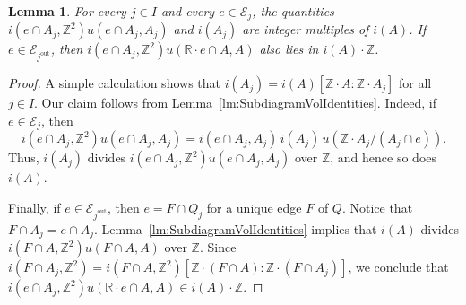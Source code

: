 \documentclass[11pt]{amsart}
\numberwithin{equation}{section}
\theoremstyle{plain}
\newtheorem{lemma}[theorem]{Lemma}
\theoremstyle{definition}
\theoremstyle{remark}
\begin{document}
\begin{lemma}\label{lm:exponents}
  For every $j\in I$ and every $e\in \mathcal{E}_j$, the quantities
  $i(e\cap A_j,{\mathbb{Z}}^2)u(e\cap A_j,A_j)$ and $i(A_j)$ are integer
  multiples of $i(A)$. If $e\in \mathcal{E}_j^\operatorname{out}$, then
  $i(e\cap A_j,{\mathbb{Z}}^2)u({\mathbb{R}}{\!\cdot\!} e\cap A,A)$ also lies in
  $i(A){\!\cdot\!} {\mathbb{Z}}$.
\end{lemma} 
\begin{proof}
  A simple calculation shows that $i(A_j)=i(A) [{\mathbb{Z}}{\!\cdot\!}
  A:{\mathbb{Z}}{\!\cdot\!} A_j]$ for all $j\in I$.  Our claim follows from
  Lemma~\ref{lm:SubdiagramVolIdentities}. Indeed, if $e\in
  \mathcal{E}_j$, then
\[
i(e\cap A_j,{\mathbb{Z}}^2)u(e\cap A_j,A_j)=i(e\cap A_j,A_j) \,i(A_j)\, u({\mathbb{Z}}{\!\cdot\!} A_j/(A_j\cap e)).
\]
 Thus, $i(A_j)$ divides  $i(e\cap A_j,{\mathbb{Z}}^2)u(e\cap A_j,A_j)$ over ${\mathbb{Z}}$, and
 hence so
 does $i(A)$. 

 Finally, if $e\in \mathcal{E}_j^\operatorname{out}$, then $e=F\cap Q_j$ for
 a unique edge $F$ of $Q$. Notice that $F\cap A_j=e\cap
 A_j$. Lemma~\ref{lm:SubdiagramVolIdentities} implies that $i(A)$
 divides $i(F\cap A,{\mathbb{Z}}^2)u(F\cap A,A)$ over ${\mathbb{Z}}$. Since $i(F\cap
 A_j,{\mathbb{Z}}^2)=i(F\cap A, {\mathbb{Z}}^2)[{\mathbb{Z}}{\!\cdot\!}(F\cap A):
 {\mathbb{Z}}{\!\cdot\!}(F\cap A_j)]$, we conclude that $i(e\cap
 A_j,{\mathbb{Z}}^2)u({\mathbb{R}}{\!\cdot\!} e\cap A,A) \in i(A){\!\cdot\!} {\mathbb{Z}}$.
\end{proof}
\end{document}
